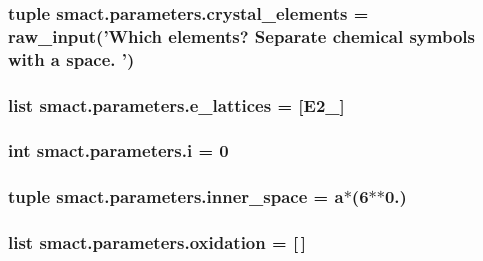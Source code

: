 \subsubsection[{crystal\+\_\+elements}]{\setlength{\rightskip}{0pt plus 5cm}tuple smact.\+parameters.\+crystal\+\_\+elements = raw\+\_\+input('Which elements? Separate chemical symbols with a space. ')}\label{namespacesmact_1_1parameters_a88c84d99ceb967bfb250f0b64c8a7818}
\hypertarget{namespacesmact_1_1parameters_abdc23b776276418ce7044c62e52c2a32}{}
\subsubsection[{e\+\_\+lattices}]{\setlength{\rightskip}{0pt plus 5cm}list smact.\+parameters.\+e\+\_\+lattices = \mbox{[}{\bf E2\+\_}\mbox{]}}\label{namespacesmact_1_1parameters_abdc23b776276418ce7044c62e52c2a32}
\hypertarget{namespacesmact_1_1parameters_a873ca6b8e0241804cc12ff4987d1a102}{}
\subsubsection[{i}]{\setlength{\rightskip}{0pt plus 5cm}int smact.\+parameters.\+i = 0}\label{namespacesmact_1_1parameters_a873ca6b8e0241804cc12ff4987d1a102}
\hypertarget{namespacesmact_1_1parameters_a4ca83f9b909f7195148ffd44a439bd16}{}
\subsubsection[{inner\+\_\+space}]{\setlength{\rightskip}{0pt plus 5cm}tuple smact.\+parameters.\+inner\+\_\+space = a$\ast$(6$\ast$$\ast$0.)}\label{namespacesmact_1_1parameters_a4ca83f9b909f7195148ffd44a439bd16}
\hypertarget{namespacesmact_1_1parameters_a14180ce62d67208c70ba3d513c19e6ca}{}
\subsubsection[{oxidation}]{\setlength{\rightskip}{0pt plus 5cm}list smact.\+parameters.\+oxidation = \mbox{[}$\,$\mbox{]}}\label{namespacesmact_1_1parameters_a14180ce62d67208c70ba3d513c19e6ca}
\hypertarget{namespacesmact_1_1parameters_a17a85db758a777f49064168e1c8c9d6b}{}
